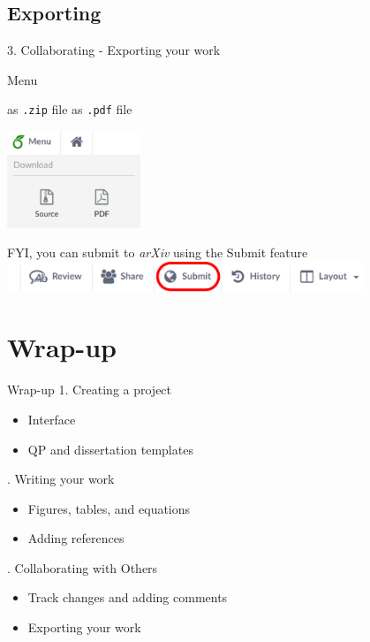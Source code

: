 \documentclass[13pt]{beamer}
\newcommand{\itemA}{\item[\textcolor{black}{\textbullet}]}
\newcommand{\green}{\textcolor{colorgreen}}
\begin{document}
\subsection{Exporting}
\begin{frame}{3. Collaborating - Exporting your work}

 \begin{fullpageitemize}
    \itemA \green{Menu}
    \hfill \break
    \begin{fullpageitemize}
    \itemBDownload as \texttt{.zip} file
    \itemBDownload as \texttt{.pdf} file
    \end{fullpageitemize}
    \includegraphics[width=0.3\textwidth,keepaspectratio]{images/download.png}
    \itemA FYI, you can submit to \textit{arXiv} using the \green{Submit} feature \hfill \break
    \includegraphics[width=0.8\textwidth,keepaspectratio]{images/submit.png}
 \end{fullpageitemize}
\end{frame}


\section{Wrap-up}
\begin{frame}{Wrap-up}
1. Creating a project
     \begin{itemize}
         \item [\textcolor{black}{\textbullet}] Interface
         \item [\textcolor{black}{\textbullet}] QP and dissertation templates
     \end{itemize} \hfill {}. Writing your work 
     \begin{itemize}
         \itemA Figures, tables, and equations 
         \itemA Adding references
     \end{itemize} \hfill {}. Collaborating with Others 
     \begin{itemize}
         \itemA Track changes and adding comments
         \itemA Exporting your work
     \end{itemize}
\end{frame}
\end{document}
